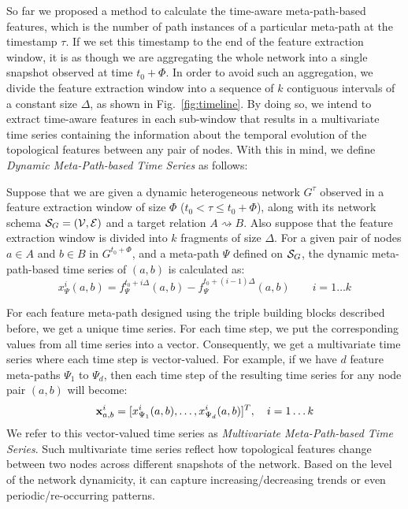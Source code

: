 So far we proposed a method to calculate the time-aware meta-path-based features, which is the number of path instances of a particular meta-path at the timestamp $\tau$. If we set this timestamp to the end of the feature extraction window, it is as though we are aggregating the whole network into a single snapshot observed at time $t_0+\Phi$. In order to avoid such an aggregation, we divide the feature extraction window into a sequence of $k$ contiguous intervals of a constant size $\Delta$, as shown in Fig.~\ref{fig:timeline}. By doing so, we intend to extract time-aware features in each sub-window that results in a multivariate time series containing the information about the temporal evolution of the topological features between any pair of nodes. With this in mind, we define \emph{Dynamic Meta-Path-based Time Series} as follows:

\begin{definition}
	Suppose that we are given a dynamic heterogeneous network $G^{\tau}$ observed in a feature extraction window of size $\Phi$ ($t_0<\tau \le t_0+\Phi$), along with its network schema $\mathcal{S}_G=(\mathcal{V}, \mathcal{E})$ and a target relation $A\rightsquigarrow B$. Also suppose that the feature extraction window is divided into $k$ fragments of size $\Delta$. For a given pair of nodes $a\in A$ and $b\in B$ in $G^{t_0+\Phi}$, and a meta-path $\Psi$ defined on $\mathcal{S}_G$, the dynamic meta-path-based time series of $(a,b)$ is calculated as:
	\begin{equation*}
		x_{\Psi}^i(a,b)=f_{\Psi}^{t_0+i\Delta}(a,b) - f_{\Psi}^{t_0+(i-1)\Delta}(a,b)\quad\quad i=1\dots k
	\end{equation*}
\end{definition}

For each feature meta-path designed using the triple building blocks described before, we get a unique time series. For each time step, we put the corresponding values from all time series into a vector. Consequently, we get a multivariate time series where each time step is vector-valued. {\color{red}For example, if we have $d$ feature meta-paths $\Psi_1$ to $\Psi_d$, then each time step of the resulting time series for any node pair $(a,b)$ will become:
\[\mathbf{x}^i_{a,b}=[x_{\Psi_1}^i(a,b),\dots,x_{\Psi_d}^i(a,b)]^T,\quad i=1\dots k\]
We refer to this vector-valued time series as \emph{Multivariate Meta-Path-based Time Series}.} Such multivariate time series reflect how topological features change between two nodes across different snapshots of the network. Based on the level of the network dynamicity, it can capture increasing/decreasing trends or even periodic/re-occurring patterns.

